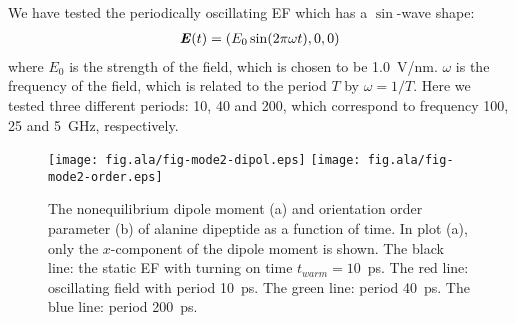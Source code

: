 \documentclass[a4paper,preprint,unsortedaddress,onecolumn]{revtex4-1}
\newcommand{\vect}[1]{\textbf{\textit{#1}}}
\begin{document}
We have tested the periodically oscillating EF which has
a $\sin$-wave shape:
\begin{align}
  \vect E(t) = (E_0\sin(2\pi \omega t), 0, 0)
\end{align}
where $E_0$ is the strength of the field, which is chosen to be
1.0~V/nm.  $\omega$ is the frequency of the field, which is related to
the period $T$ by $\omega = 1/T$.  Here we tested three different
periods: 10, 40 and 200, which correspond
to frequency 100, 25 and 5~GHz, respectively.


\begin{figure}
  \centering
  \texttt{[image: fig.ala/fig-mode2-dipol.eps]}
  \texttt{[image: fig.ala/fig-mode2-order.eps]}
  \caption{The nonequilibrium dipole moment (a) and
    orientation order parameter (b) of alanine dipeptide as a
    function of time. In plot (a),
    only the $x$-component of the dipole moment is
    shown. The black line: the static EF with turning on
    time $t_{warm} = 10$~ps. The red line: oscillating field with period
    10~ps. The green line: period 40~ps. The blue line: period 200~ps.}
  \label{fig:tmp8}
\end{figure}
\end{document}
